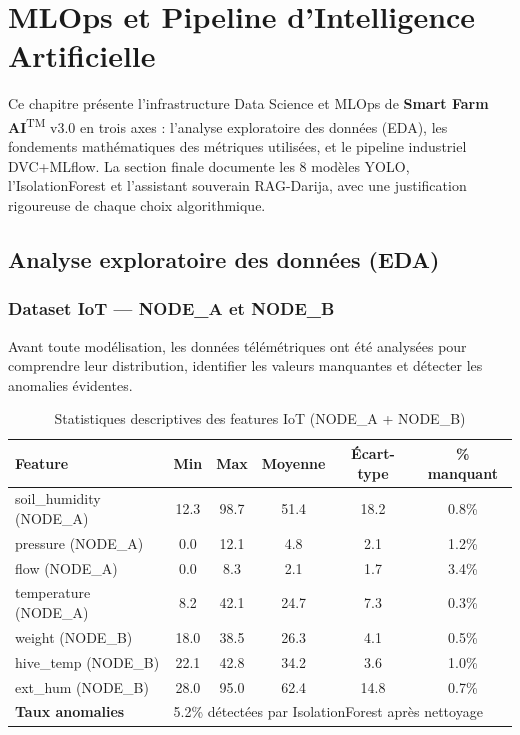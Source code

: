 \documentclass[12pt,a4paper,oneside]{report}
\newcommand{\farmAI}{\textbf{Smart Farm AI}\textsuperscript{TM}}
\begin{document}
\chapter{MLOps et Pipeline d'Intelligence Artificielle}

\noindent Ce chapitre présente l'infrastructure Data Science et MLOps de \farmAI{}
v3.0 en trois axes : l'analyse exploratoire des données (EDA), les fondements
mathématiques des métriques utilisées, et le pipeline industriel DVC+MLflow.
La section finale documente les 8 modèles YOLO, l'IsolationForest et l'assistant
souverain RAG-Darija, avec une justification rigoureuse de chaque choix algorithmique.

\section{Analyse exploratoire des données (EDA)}

\subsection{Dataset IoT — NODE\_A et NODE\_B}

Avant toute modélisation, les données télémétriques ont été analysées pour comprendre
leur distribution, identifier les valeurs manquantes et détecter les anomalies évidentes.

\begin{table}[H]\centering
\caption{Statistiques descriptives des features IoT (NODE\_A + NODE\_B)}
\label{tab:eda_iot}
\small
\begin{tabular}{lccccc}
\toprule
\textbf{Feature}&\textbf{Min}&\textbf{Max}&\textbf{Moyenne}&\textbf{Écart-type}&\textbf{\% manquant}\\
\midrule
soil\_humidity (NODE\_A) & 12.3 & 98.7 & 51.4 & 18.2 & 0.8\% \\
pressure (NODE\_A)       & 0.0  & 12.1 & 4.8  & 2.1  & 1.2\% \\
flow (NODE\_A)           & 0.0  & 8.3  & 2.1  & 1.7  & 3.4\% \\
temperature (NODE\_A)    & 8.2  & 42.1 & 24.7 & 7.3  & 0.3\% \\
weight (NODE\_B)         & 18.0 & 38.5 & 26.3 & 4.1  & 0.5\% \\
hive\_temp (NODE\_B)     & 22.1 & 42.8 & 34.2 & 3.6  & 1.0\% \\
ext\_hum (NODE\_B)       & 28.0 & 95.0 & 62.4 & 14.8 & 0.7\% \\
\midrule
\textbf{Taux anomalies} & \multicolumn{5}{l}{5.2\% détectées par IsolationForest après nettoyage} \\
\bottomrule
\end{tabular}
\end{table}
\end{document}
